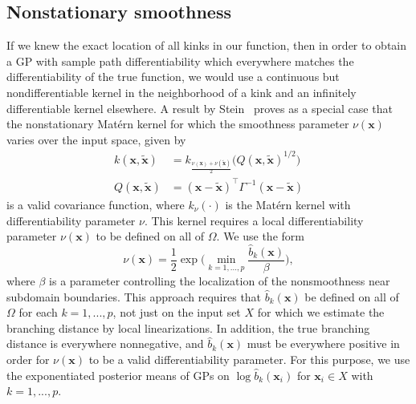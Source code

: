 \documentclass{article}
\renewcommand{\vec}[1]{\mathbf{#1}}
\numberwithin{equation}{section}
\begin{document}
\subsection{Nonstationary smoothness}
If we knew the exact location of all kinks in our function, then in order to obtain a GP with sample path differentiability which everywhere matches the differentiability of the true function, we would use a continuous but nondifferentiable kernel in the neighborhood of a kink and an infinitely differentiable kernel elsewhere. A result by Stein~\cite{stein2005nonstationary} proves as a special case that the nonstationary Mat\'ern kernel for which the smoothness parameter $\nu(\vec{x})$ varies over the input space, given by
\begin{align*}
  k(\vec{x}, \tilde{\vec{x}})
  & = k_{\frac{\nu(\vec{x}) + \nu(\tilde{\vec{x}})}{2}}\Big(Q(\vec{x}, \tilde{\vec{x}})^{1/2}\Big) \\
  Q(\vec{x}, \tilde{\vec{x}}) & = (\vec{x} - \tilde{\vec{x}})^\top \Gamma^{-1} (\vec{x} - \tilde{\vec{x}})
\end{align*}
is a valid covariance function, where $k_\nu(\cdot)$ is the Mat\'ern kernel with differentiability parameter $\nu$. This kernel requires a local differentiability parameter $\nu(\vec{x})$ to be defined on all of $\Omega$. We use the form
\begin{equation}
  \nu(\vec{x}) = \frac{1}{2} \exp\bigg(\min_{k=1,...,p} \frac{\hat{b}_k(\vec{x})}{\beta} \bigg) \label{eq:smoothness},
\end{equation}
where $\beta$ is a parameter controlling the localization of the nonsmoothness near subdomain boundaries. This approach requires that $\hat{b}_k(\vec{x})$ be defined on all of $\Omega$ for each $k=1,...,p$, not just on the input set $X$ for which we estimate the branching distance by local linearizations. In addition, the true branching distance is everywhere nonnegative, and $\hat{b}_k(\vec{x})$ must be everywhere positive in order for $\nu(\vec{x})$ to be a valid differentiability parameter. For this purpose, we use the exponentiated posterior means of GPs on $\log \hat{b}_k(\vec{x}_i)$ for $\vec{x}_i \in X$ with $k=1,...,p$.
\end{document}
